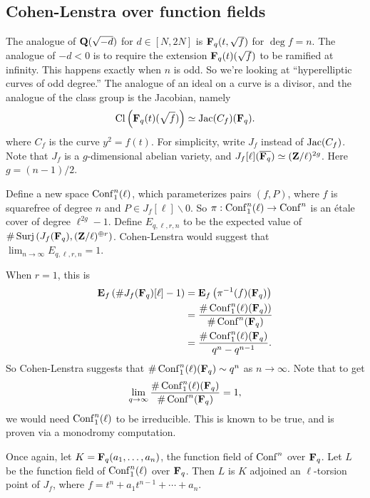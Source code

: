 \subsection{Cohen-Lenstra over function fields}

The analogue of $\mathbf{Q}(\sqrt{-d})$ for $d\in [N,2 N]$ is 
$\mathbf{F}_q(t,\sqrt f)$ for $\deg f=n$. The analogue of $-d<0$ is to require the 
extension $\mathbf{F}_q(t)(\sqrt f)$ to be ramified at infinity. This happens exactly 
when $n$ is odd. So we're looking at ``hyperelliptic curves of odd degree.'' 
The analogue of an ideal on a curve is a divisor, and the analogue of the class 
group is the Jacobian, namely 
\[
  \operatorname{Cl}\left(\mathbf{F}_q(t)(\sqrt f)\right) \simeq \operatorname{Jac}(C_f)(\mathbf{F}_q) .
\]
where $C_f$ is the curve $y^2=f(t)$. For simplicity, write $J_f$ instead of 
$\operatorname{Jac}(C_f)$. Note that $J_f$ is a $g$-dimensional abelian variety, and 
$J_f[\ell](\overline{\mathbf{F}_q}) \simeq (\mathbf{Z}/\ell)^{2 g}$. Here $g=(n-1)/2$. 

Define a new space $\operatorname{Conf}_1^n(\ell)$, which parameterizes pairs 
$(f,P)$, where $f$ is squarefree of degree $n$ and 
$P\in J_f[\ell]\smallsetminus 0$. So 
$\pi:\operatorname{Conf}_1^n(\ell) \to \operatorname{Conf}^n$ is an \'etale cover of degree 
$\ell^{2g}-1$. Define $E_{q,\ell,r,n}$ to be the expected value of 
$\#\operatorname{Surj}\left(J_f(\mathbf{F}_q),(\mathbf{Z}/\ell)^{\oplus r}\right)$. Cohen-Lenstra 
would suggest that $\lim_{n\to \infty} E_{q,\ell,r,n} = 1$. 

When $r=1$, this is 
\begin{align*}
  \operatorname{\mathbf{E}}_f\left(\# J_f(\mathbf{F}_q)[\ell]-1\right) 
    &= \operatorname{\mathbf{E}}_f\left(\pi^{-1}(f)(\mathbf{F}_q)\right) \\
    &= \frac{\#\operatorname{Conf}_1^n(\ell)(\mathbf{F}_q))}{\#\operatorname{Conf}^n(\mathbf{F}_q)} \\
    &= \frac{\#\operatorname{Conf}_1^n(\ell)(\mathbf{F}_q)}{q^n-q^{n-1}} .
\end{align*}
So Cohen-Lenstra suggests that $\#\operatorname{Conf}_1^n(\ell)(\mathbf{F}_q)\sim q^n$ as 
$n\to \infty$. Note that to get 
\[
  \lim_{q\to \infty} \frac{\#\operatorname{Conf}_1^n(\ell)(\mathbf{F}_q)}{\#\operatorname{Conf}^n(\mathbf{F}_q)} = 1,
\]
we would need $\operatorname{Conf}_1^n(\ell)$ to be irreducible. This is known to 
be true, and is proven via a monodromy computation. 

Once again, let $K=\mathbf{F}_q(a_1,\dots,a_n)$, the function field of 
$\operatorname{Conf}^n$ over $\mathbf{F}_q$. Let $L$ be the function field of 
$\operatorname{Conf}_1^n(\ell)$ over $\mathbf{F}_q$. Then $L$ is $K$ adjoined an 
$\ell$-torsion point of $J_f$, where $f=t^n+a_1 t^{n-1} + \cdots + a_n$. 

